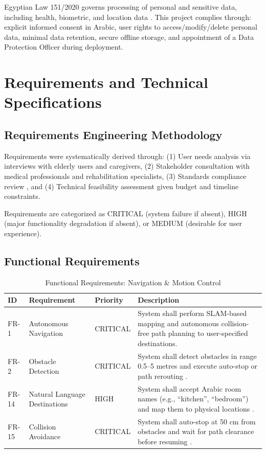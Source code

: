 \documentclass[12pt,a4paper]{report}
\renewcommand{\arraystretch}{1.45}
\renewcommand{\arraystretch}{1.3}
\begin{document}
Egyptian Law 151/2020 governs processing of personal and sensitive data, including health, biometric, and location data \cite{egypt_law_151}. This project complies through: explicit informed consent in Arabic, user rights to access/modify/delete personal data, minimal data retention, secure offline storage, and appointment of a Data Protection Officer during deployment.

\section{Requirements and Technical Specifications}

\subsection{Requirements Engineering Methodology}

Requirements were systematically derived through: (1) User needs analysis via interviews with elderly users and caregivers, (2) Stakeholder consultation with medical professionals and rehabilitation specialists, (3) Standards compliance review \cite{iso7176_4,iso13482,egypt_law_151}, and (4) Technical feasibility assessment given budget and timeline constraints.

Requirements are categorized as CRITICAL (system failure if absent), HIGH (major functionality degradation if absent), or MEDIUM (desirable for user experience).

\subsection{Functional Requirements}

\begin{table}[H]
\centering
\caption{Functional Requirements: Navigation \& Motion Control}
\label{tab:fr_nav}
{\renewcommand{\arraystretch}{1.6}
\begin{tabularx}{\textwidth}{@{}p{0.8cm}p{3.2cm}p{1.8cm}X@{}}
\toprule
\textbf{ID} & \textbf{Requirement} & \textbf{Priority} & \textbf{Description} \\
\midrule
FR-1  & Autonomous Navigation & CRITICAL & System shall perform SLAM-based mapping  and autonomous collision-free path planning \cite{zhao2019multi} to user-specified destinations. \\
\midrule
FR-2  & Obstacle Detection    & CRITICAL & System shall detect obstacles in range 0.5--5 metres and execute auto-stop or path rerouting \cite{iso13482}. \\
\midrule
FR-14 & Natural Language Destinations & HIGH & System shall accept Arabic room names (e.g., ``kitchen'', ``bedroom'') and map them to physical locations . \\
\midrule
FR-15 & Collision Avoidance   & CRITICAL & System shall auto-stop at 50 cm from obstacles and wait for path clearance before resuming \cite{iso13482}. \\
\bottomrule
\end{tabularx}}
\end{table}
\end{document}
